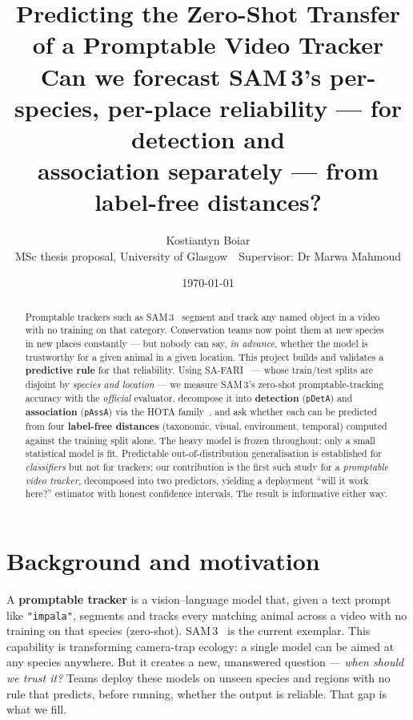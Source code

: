 \documentclass[11pt]{article}
\title{\textbf{Predicting the Zero-Shot Transfer of a Promptable Video Tracker}\\[2pt]
\large Can we forecast SAM\,3's per-species, per-place reliability --- for detection and\\
association separately --- from label-free distances?}
\author{Kostiantyn Boiar\\[2pt]
\small MSc thesis proposal, University of Glasgow \,\textbullet\, Supervisor: Dr Marwa Mahmoud}
\date{\today}
\begin{document}
\maketitle

\begin{abstract}
\noindent Promptable trackers such as SAM\,3~\cite{sam3} segment and track any named object in a
video with no training on that category. Conservation teams now point them at new species in new
places constantly --- but nobody can say, \emph{in advance}, whether the model is trustworthy for a
given animal in a given location. This project builds and validates a \textbf{predictive rule} for
that reliability. Using SA-FARI~\cite{safari} --- whose train/test splits are disjoint by
\emph{species and location} --- we measure SAM\,3's zero-shot promptable-tracking accuracy with the
\emph{official} evaluator, decompose it into \textbf{detection} (\texttt{pDetA}) and
\textbf{association} (\texttt{pAssA}) via the HOTA family~\cite{hota}, and ask whether each can be
predicted from four \textbf{label-free distances} (taxonomic, visual, environment, temporal) computed
against the training split alone. The heavy model is frozen throughout; only a small statistical model
is fit. Predictable out-of-distribution generalisation is established for \emph{classifiers}
\cite{aotl,agl} but not for trackers; our contribution is the first such study for a \emph{promptable
video tracker}, decomposed into two predictors, yielding a deployment ``will it work here?'' estimator
with honest confidence intervals. The result is informative either way.
\end{abstract}

\section{Background and motivation}
A \textbf{promptable tracker} is a vision--language model that, given a text prompt like
\texttt{"impala"}, segments and tracks every matching animal across a video with no training on that
species (zero-shot). SAM\,3~\cite{sam3} is the current exemplar. This capability is transforming
camera-trap ecology: a single model can be aimed at any species anywhere. But it creates a new,
unanswered question --- \emph{when should we trust it?} Teams deploy these models on unseen species
and regions with no rule that predicts, before running, whether the output is reliable. That gap is
what we fill.
\end{document}
